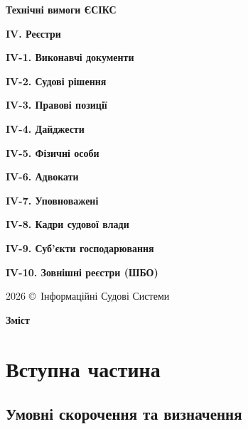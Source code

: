 \documentclass{article}
\newcommand\HUGE[1]{\fontsize{40}{40}\selectfont #1}
\begin{document}
\pagestyle{fancy}

\begin{titlepage}
  \AddToShipoutPictureBG*{\AtPageLowerLeft{\color{nato}\rule{\paperwidth}{\paperheight}}}
  \color{white}\thispagestyle{empty}\vspace*{4cm}\centering
  {\Huge  \textbf{Технічні вимоги ЄСІКС} \par} \vspace{2cm}
  {\HUGE  \textbf{IV. Реєстри} \par} \vspace{2.5cm}
  {\LARGE \textbf{IV-1. Виконавчі документи} \par}
  {\LARGE \textbf{IV-2. Судові рішення} \par}
  {\LARGE \textbf{IV-3. Правові позиції} \par}
  {\LARGE \textbf{IV-4. Дайджести} \par}
  {\LARGE \textbf{IV-5. Фізичні особи} \par}
  {\LARGE \textbf{IV-6. Адвокати} \par}
  {\LARGE \textbf{IV-7. Уповноважені} \par}
  {\LARGE \textbf{IV-8. Кадри судової влади} \par}
  {\LARGE \textbf{IV-9. Суб'єкти господарювання} \par}
  {\LARGE \textbf{IV-10. Зовнішні реєстри (ШБО)} \par}
  \vfill
  {\large 2026 \copyright\ Інформаційні Судові Системи \par}
\end{titlepage}

\newpage
\begin{center}
  {\Huge\color{nato}\bfseries Зміст\par}
\end{center}
\vspace{40pt}
\tableofcontents

\begin{abstract}
ТЕХНІЧНІ ВИМОГИ
НА СТВОРЕННЯ ЗАСОБУ ІНФОРМАТИЗАЦІЇ - КОМПОНЕНТІВ “РЕЄСТРИ”, МАЙСТЕР РЕЄСТРІВ, ЄДРСР, ЄДРВД В РАМКАХ
ЄДИНОЇ СУДОВОЇ ІНФОРМАЦІЙНО-КОМУНІКАЦІЙНОЇ СИСТЕМИ.
\end{abstract}

\newpage
\section*{Вступна частина}

\subsection*{Умовні скорочення та визначення}
\end{document}

